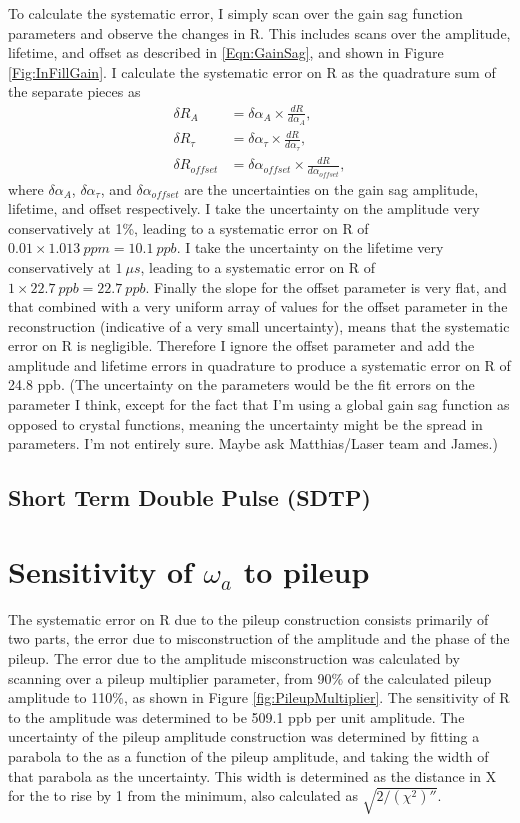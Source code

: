 		To calculate the systematic error, I simply scan over the gain sag function parameters and observe the changes in R. This includes scans over the amplitude, lifetime, and offset as described in \ref{Eqn:GainSag}, and shown in Figure \ref{Fig:InFillGain}. I calculate the systematic error on R as the quadrature sum of the separate pieces as 
		\begin{align}
			\delta R_{A} &= \delta\alpha_{A} \times \frac{dR}{d\alpha_{A}}, \\
			\delta R_{\tau} &= \delta\alpha_{\tau} \times \frac{dR}{d\alpha_{\tau}}, \\
			\delta R_{offset} &= \delta\alpha_{offset} \times \frac{dR}{d\alpha_{offset}},
		\end{align}
		where $\delta\alpha_{A}$, $\delta\alpha_{\tau}$, and $\delta\alpha_{offset}$ are the uncertainties on the gain sag amplitude, lifetime, and offset respectively. I take the uncertainty on the amplitude very conservatively at 1\%, leading to a systematic error on R of $0.01 \times \SI{1.013}{ppm} = \SI{10.1}{ppb}$. I take the uncertainty on the lifetime very conservatively at $\SI{1}{\mu s}$, leading to a systematic error on R of $1 \times \SI{22.7}{ppb} = \SI{22.7}{ppb}$. Finally the slope for the offset parameter is very flat, and that combined with a very uniform array of values for the offset parameter in the reconstruction (indicative of a very small uncertainty), means that the systematic error on R is negligible. Therefore I ignore the offset parameter and add the amplitude and lifetime errors in quadrature to produce a systematic error on R of 24.8 ppb. (The uncertainty on the parameters would be the fit errors on the parameter I think, except for the fact that I'm using a global gain sag function as opposed to crystal functions, meaning the uncertainty might be the spread in parameters. I'm not entirely sure. Maybe ask Matthias/Laser team and James.)

	\subsection{Short Term Double Pulse (SDTP)}


\section{Sensitivity of \texorpdfstring{$\omega_{a}$}{} to pileup}

	The systematic error on R due to the pileup construction consists primarily of two parts, the error due to misconstruction of the amplitude and the phase of the pileup. The error due to the amplitude misconstruction was calculated by scanning over a pileup multiplier parameter, from 90\% of the calculated pileup amplitude to 110\%, as shown in Figure \ref{fig:PileupMultiplier}. The sensitivity of R to the amplitude was determined to be 509.1 ppb per unit amplitude. The uncertainty of the pileup amplitude construction was determined by fitting a parabola to the \chisq as a function of the pileup amplitude, and taking the width of that parabola as the uncertainty. This width is determined as the distance in X for the \chisq to rise by 1 from the minimum, also calculated as $\sqrt{2/(\chi^{2})''}$.

